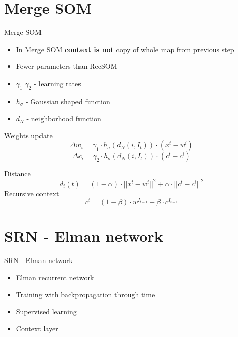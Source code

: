 \documentclass{article}
\begin{document}
\section{Merge SOM}

\begin{frame}[fragile]{Merge SOM}

\begin{itemize}
\item In Merge SOM \textbf{context is not} copy of whole map from previous step
\item Fewer parameters than RecSOM
\item $\gamma_1$ $\gamma_2$ - learning rates
\item $h_{\sigma}$ - Gaussian shaped function
\item $d_N$ - neighborhood function
\end{itemize}
Weights update
\begin{equation*}
\Delta w_i = \gamma_{1} \cdot h_{\sigma}(d_{N}(i, I_{t})) \cdot (x^t - w^i)
\end{equation*}
\begin{equation*}
\Delta c_i = \gamma_{2} \cdot h_{\sigma}(d_{N}(i, I_{t})) \cdot (c^t - c^i)
\end{equation*}

Distance
\begin{equation*}
d_i(t) = (1-\alpha) \cdot ||x^t - w^i||^2 + \alpha \cdot ||c^t - c^i||^2
\end{equation*}
Recursive context
\begin{equation*}
c^t = (1 - \beta) \cdot w^{I_{t-1}} + \beta \cdot c^{I_{t-1}}
\end{equation*}

\end{frame}

\section{SRN - Elman network}

\begin{frame}[fragile]{SRN - Elman network}

\begin{itemize}
\item Elman recurrent network
\item Training with backpropagation through time
\item Supervised learning
\item Context layer 
\end{itemize}

\end{frame}
\end{document}
